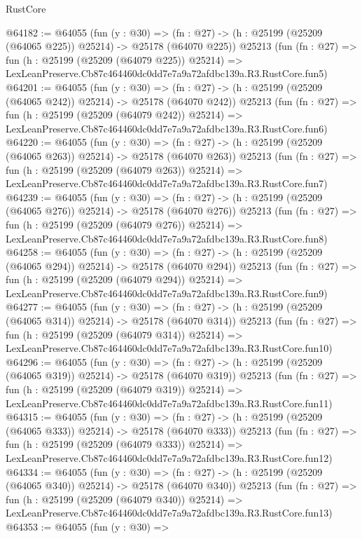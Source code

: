 \begin{lexlean}{RustCore}
\begin{coremodule}
@64182 := @64055
    (fun (y : @30) =>
    (fn : @27) -> (h : @25199 (@25209 (@64065 @225)) @25214) -> @25178 (@64070 @225))
    @25213
    (fun (fn : @27) =>
    fun (h : @25199 (@25209 (@64079 @225)) @25214) =>
    LexLeanPreserve.Cb87c464460dc0dd7e7a9a72afdbc139a.R3.RustCore.fun5)
@64201 := @64055
    (fun (y : @30) =>
    (fn : @27) -> (h : @25199 (@25209 (@64065 @242)) @25214) -> @25178 (@64070 @242))
    @25213
    (fun (fn : @27) =>
    fun (h : @25199 (@25209 (@64079 @242)) @25214) =>
    LexLeanPreserve.Cb87c464460dc0dd7e7a9a72afdbc139a.R3.RustCore.fun6)
@64220 := @64055
    (fun (y : @30) =>
    (fn : @27) -> (h : @25199 (@25209 (@64065 @263)) @25214) -> @25178 (@64070 @263))
    @25213
    (fun (fn : @27) =>
    fun (h : @25199 (@25209 (@64079 @263)) @25214) =>
    LexLeanPreserve.Cb87c464460dc0dd7e7a9a72afdbc139a.R3.RustCore.fun7)
@64239 := @64055
    (fun (y : @30) =>
    (fn : @27) -> (h : @25199 (@25209 (@64065 @276)) @25214) -> @25178 (@64070 @276))
    @25213
    (fun (fn : @27) =>
    fun (h : @25199 (@25209 (@64079 @276)) @25214) =>
    LexLeanPreserve.Cb87c464460dc0dd7e7a9a72afdbc139a.R3.RustCore.fun8)
@64258 := @64055
    (fun (y : @30) =>
    (fn : @27) -> (h : @25199 (@25209 (@64065 @294)) @25214) -> @25178 (@64070 @294))
    @25213
    (fun (fn : @27) =>
    fun (h : @25199 (@25209 (@64079 @294)) @25214) =>
    LexLeanPreserve.Cb87c464460dc0dd7e7a9a72afdbc139a.R3.RustCore.fun9)
@64277 := @64055
    (fun (y : @30) =>
    (fn : @27) -> (h : @25199 (@25209 (@64065 @314)) @25214) -> @25178 (@64070 @314))
    @25213
    (fun (fn : @27) =>
    fun (h : @25199 (@25209 (@64079 @314)) @25214) =>
    LexLeanPreserve.Cb87c464460dc0dd7e7a9a72afdbc139a.R3.RustCore.fun10)
@64296 := @64055
    (fun (y : @30) =>
    (fn : @27) -> (h : @25199 (@25209 (@64065 @319)) @25214) -> @25178 (@64070 @319))
    @25213
    (fun (fn : @27) =>
    fun (h : @25199 (@25209 (@64079 @319)) @25214) =>
    LexLeanPreserve.Cb87c464460dc0dd7e7a9a72afdbc139a.R3.RustCore.fun11)
@64315 := @64055
    (fun (y : @30) =>
    (fn : @27) -> (h : @25199 (@25209 (@64065 @333)) @25214) -> @25178 (@64070 @333))
    @25213
    (fun (fn : @27) =>
    fun (h : @25199 (@25209 (@64079 @333)) @25214) =>
    LexLeanPreserve.Cb87c464460dc0dd7e7a9a72afdbc139a.R3.RustCore.fun12)
@64334 := @64055
    (fun (y : @30) =>
    (fn : @27) -> (h : @25199 (@25209 (@64065 @340)) @25214) -> @25178 (@64070 @340))
    @25213
    (fun (fn : @27) =>
    fun (h : @25199 (@25209 (@64079 @340)) @25214) =>
    LexLeanPreserve.Cb87c464460dc0dd7e7a9a72afdbc139a.R3.RustCore.fun13)
@64353 := @64055
    (fun (y : @30) =>

\end{coremodule}
\end{lexlean}
